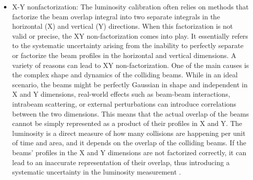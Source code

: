 \begin{itemize}
\item  X-Y nonfactorization: The luminosity calibration often relies on methods that factorize the beam overlap integral into two separate integrals in the horizontal (X) and vertical (Y) directions. When this factorization is not valid or precise, the XY non-factorization comes into play. It essentially refers to the systematic uncertainty arising from the inability to perfectly separate or factorize the beam profiles in the horizontal and vertical dimensions. A variety of reasons can lead to XY non-factorization. One of the main causes is the complex shape and dynamics of the colliding beams. While in an ideal scenario, the beams might be perfectly Gaussian in shape and independent in X and Y dimensions, real-world effects such as beam-beam interactions, intrabeam scattering, or external perturbations can introduce correlations between the two dimensions. This means that the actual overlap of the beams cannot be simply represented as a product of their profiles in X and Y. The luminosity is a direct measure of how many collisions are happening per unit of time and area, and it depends on the overlap of the colliding beams. If the beams' profiles in the X and Y dimensions are not factorized correctly, it can lead to an inaccurate representation of their overlap, thus introducing a systematic uncertainty in the luminosity measurement \cite{CERNLUMPOG}.

\end{itemize}
